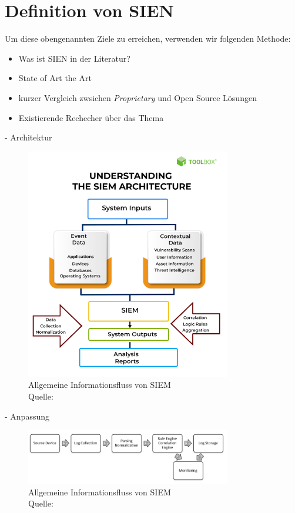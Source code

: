 \section{Definition von SIEN}

Um diese obengenannten Ziele zu erreichen, verwenden wir folgenden Methode:

\begin{itemize}[noitemsep]
   \item Was ist SIEN in der Literatur?
   \item State of Art the Art
   \item kurzer Vergleich zwsichen \textit{\gls{Proprietary}} und \gls{Open Source} Lösungen
   \item Existierende Rechecher über das Thema
\end{itemize}


- Architektur %
\begin{figure}[H]
   \centering
   \includegraphics[width=0.8\textwidth]{assets/2_p1.png}
   \caption{Allgemeine Informationsfluss von \gls{SIEM} \\Quelle: \citep{Mohanan_What} }
   \centering
\end{figure}

- Anpassung %

\begin{figure}[H]
   \centering
   \includegraphics[width=0.8\textwidth]{assets/2_p2.png}
   \caption{Allgemeine Informationsfluss von \gls{SIEM} \\Quelle: \citep{Granadillo_SIEM} }
   \centering
\end{figure}








